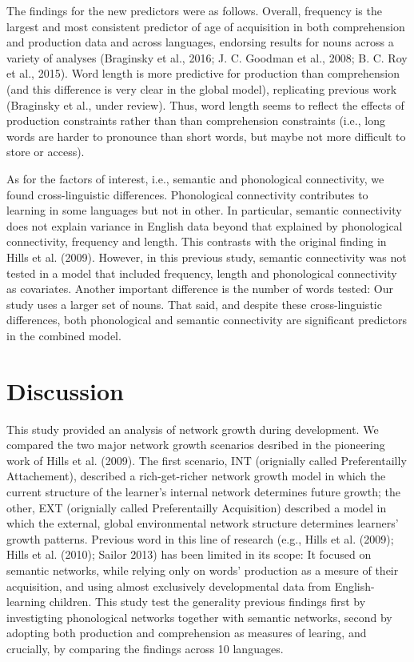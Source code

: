 \documentclass[english,floatsintext,man]{apa6}
\theoremstyle{definition}
\theoremstyle{definition}
\theoremstyle{definition}
\theoremstyle{remark}
\begin{document}
The findings for the new predictors were as follows. Overall, frequency
is the largest and most consistent predictor of age of acquisition in
both comprehension and production data and across languages, endorsing
results for nouns across a variety of analyses (Braginsky et al., 2016;
J. C. Goodman et al., 2008; B. C. Roy et al., 2015). Word length is more
predictive for production than comprehension (and this difference is
very clear in the global model), replicating previous work (Braginsky et
al., under review). Thus, word length seems to reflect the effects of
production constraints rather than than comprehension constraints (i.e.,
long words are harder to pronounce than short words, but maybe not more
difficult to store or access).

As for the factors of interest, i.e., semantic and phonological
connectivity, we found cross-linguistic differences. Phonological
connectivity contributes to learning in some languages but not in other.
In particular, semantic connectivity does not explain variance in
English data beyond that explained by phonological connectivity,
frequency and length. This contrasts with the original finding in Hills
et al. (2009). However, in this previous study, semantic connectivity
was not tested in a model that included frequency, length and
phonological connectivity as covariates. Another important difference is
the number of words tested: Our study uses a larger set of nouns. That
said, and despite these cross-linguistic differences, both phonological
and semantic connectivity are significant predictors in the combined
model.

\section{Discussion}\label{discussion}

This study provided an analysis of network growth during development. We
compared the two major network growth scenarios desribed in the
pioneering work of Hills et al. (2009). The first scenario, INT
(orignially called Preferentailly Attachement), described a
rich-get-richer network growth model in which the current structure of
the learner's internal network determines future growth; the other, EXT
(orignially called Preferentailly Acquisition) described a model in
which the external, global environmental network structure determines
learners' growth patterns. Previous word in this line of research (e.g.,
Hills et al. (2009); Hills et al. (2010); Sailor 2013) has been limited
in its scope: It focused on semantic networks, while relying only on
words' production as a mesure of their acquisition, and using almost
exclusively developmental data from English-learning children. This
study test the generality previous findings first by investigting
phonological networks together with semantic networks, second by
adopting both production and comprehension as measures of learing, and
crucially, by comparing the findings across 10 languages.
\end{document}
